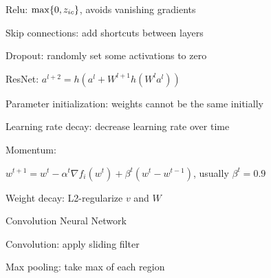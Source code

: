 \documentclass[10pt]{article}
\makeatletter
\newcommand{\tab}{\hspace{.02\textwidth}}
\newcommand{\set}[1]{\left\{#1\right\}}
\let\originalleft\left
\let\originalright\right
\renewcommand{\left}{\mathopen{}\mathclose\bgroup\originalleft}
\renewcommand{\right}{\aftergroup\egroup\originalright}
\renewcommand{\section}{\@startsection{section}{1}{0ex}{-1ex}{0.7ex}
                        {\normalfont\normalsize\bfseries}}
\makeatother
\begin{document}
\begin{multicols*}{3}
Relu: $\max\set{0,z_{ic}}$, avoids vanishing gradients

Skip connections: add shortcuts between layers

Dropout: randomly set some activations to zero

ResNet: $a^{l+2}=h(a^l+W^{l+1}h(W^la^l))$

Parameter initialization: weights cannot be the same initially

Learning rate decay: decrease learning rate over time

Momentum:

\tab $w^{t+1}=w^t-\alpha^t\nabla f_i(w^t)+\beta^t(w^t-w^{t-1})$, usually $\beta^t=0.9$

Weight decay: L2-regularize $v$ and $W$

\section{Convolution Neural Network}

Convolution: apply sliding filter

Max pooling: take max of each region

\end{multicols*}
\end{document}

